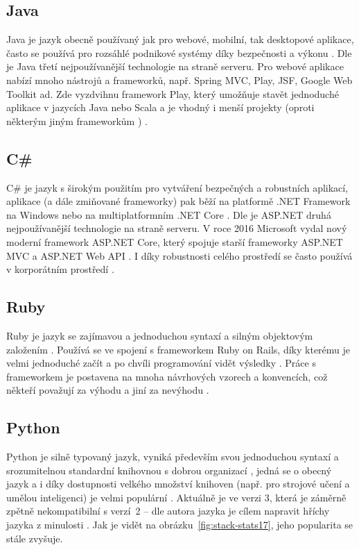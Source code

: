         \subsection{Java}
        Java je jazyk obecně používaný jak pro webové, mobilní, tak desktopové aplikace, často se používá pro rozsáhlé podnikové systémy díky bezpečnosti a výkonu \cite{tech2}. Dle \cite{tech-php1} je Java třetí nejpoužívanější technologie na straně serveru. Pro webové aplikace nabízí mnoho nástrojů a frameworků, např. Spring MVC, Play, JSF, Google Web Toolkit ad. Zde vyzdvihnu framework Play, který umožňuje stavět jednoduché aplikace v jazycích Java nebo Scala a je vhodný i menší projekty (oproti některým jiným frameworkům \cite{tech-java1}) \cite{tech-java2}.
        
        \subsection{C\#}
        C\# je jazyk s širokým použitím pro vytváření bezpečných a robustních aplikací, aplikace (a dále zmiňované frameworky) pak běží na platformě .NET Framework na Windows nebo na multiplatformním .NET Core \cite{tech-csharp1}. Dle \cite{tech-php1} je ASP.NET druhá nejpoužívanější technologie na straně serveru. V roce 2016 Microsoft vydal nový moderní framework ASP.NET Core, který spojuje starší frameworky ASP.NET MVC a ASP.NET Web API \cite{tech-csharp1}. I díky robustnosti celého prostředí se často používá v korporátním prostředí \cite{tech-csharp3}. 
        
        \subsection{Ruby}
        Ruby je jazyk se zajímavou a jednoduchou syntaxí a silným objektovým založením \cite{tech-ruby1}.
        Používá se ve spojení s frameworkem Ruby on Rails, díky kterému je velmi jednoduché začít a po chvíli programování vidět výsledky \cite{tech1}. Práce s frameworkem je postavena na mnoha návrhových vzorech a konvencích, což někteří považují za výhodu \cite{tech1} a jiní za nevýhodu \cite{tech-ruby2}.
        
        \subsection{Python}\label{sec:python}
        Python je silně typovaný jazyk, vyniká především svou jednoduchou syntaxí a srozumitelnou standardní knihovnou s dobrou organizací \cite{tech-python1}, jedná se o obecný jazyk a i díky dostupnosti velkého množství knihoven (např. pro strojové učení a umělou inteligenci) je velmi populární \cite{tech-python3}. Aktuálně je ve verzi 3, která je záměrně zpětně nekompatibilní s verzí~2 -- dle autora jazyka je cílem napravit hříchy jazyka z minulosti \cite{tech-python6}. Jak je vidět na obrázku~\ref{fig:stack-stats17}, jeho popularita se stále zvyšuje.
        
